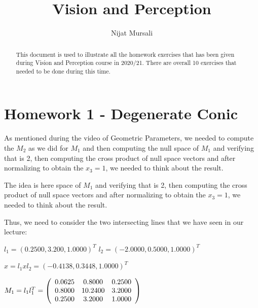 \documentclass[]{article}
\title{Vision and Perception}
\author{Nijat Mursali}
\begin{document}
\maketitle

\begin{abstract}
	This document is used to illustrate all the homework exercises that has been given during Vision and Perception course in 2020/21. There are overall 10 exercises that needed to be done during this time. 


\end{abstract}

\section{Homework 1 - Degenerate Conic}
As mentioned during the video of Geometric Parameters, we needed to compute the $M_{2}$ as we did for $M_{1}$ and then computing the null space of $M_{1}$ and verifying that is 2, then computing the cross product of null space vectors and after normalizing to obtain the $x_{3} = 1$, we needed to think about the result.
\vspace{0.4em}

The idea is here space of $M_{1}$ and verifying that is 2, then computing the cross product of null space vectors and after normalizing to obtain the $x_{3} = 1$, we needed to think about the result.	


Thus, we need to consider the two intersecting lines that we have seen in our lecture: 

\centerline {
$l_{1} = (0.2500, 3.200, 1.0000)^T$  
$l_{2} = (-2.0000, 0.5000, 1.0000)^T$ 
}

\centerline {
	$x = l_{1}xl_{2} = (-0.4138, 0.3448, 1.0000)^T$
}

\vspace{0.5em}

\centerline {
$M_{1} = l_{1}l_{1}^T = 
\left( {\begin{array}{*{20}c}
	0.0625 & 0.8000 & 0.2500 \\
	0.8000 & 10.2400 & 3.2000 \\
	0.2500 &  3.2000 & 1.0000   
	\end{array} } \right)$
}
\end{document}
